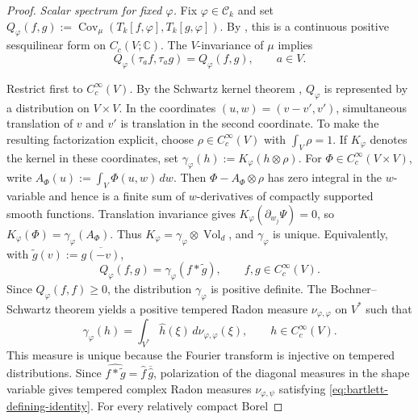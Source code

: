 \documentclass[11pt,reqno,a4paper]{amsart}
\numberwithin{equation}{section}
\theoremstyle{compact}
\theoremstyle{definition}
\theoremstyle{definition}
\newcommand{\Cov}{\operatorname{Cov}}
\newcommand{\Vol}{\operatorname{Vol}}
\begin{document}
\begin{proof}
\smallskip\noindent\emph{Scalar spectrum for fixed $\varphi$.}
Fix $\varphi\in\mathcal C_k$ and set
$Q_\varphi(f,g):=\Cov_\mu(T_k[f,\varphi],T_k[g,\varphi])$.  By
, this is a continuous positive
sesquilinear form on $C_c(V;\mathbb C)$.  The $V$-invariance of $\mu$
implies
\begin{equation}\label{eq:bartlett-translation-invariance}
  Q_\varphi(\tau_a f,\tau_a g)=Q_\varphi(f,g),
  \qquad a\in V.
\end{equation}

Restrict first to $C_c^\infty(V)$.  By the Schwartz kernel theorem
\cite{Sch66}, $Q_\varphi$ is represented by a distribution on
$V\times V$.  In the
coordinates $(u,w)=(v-v',v')$, simultaneous translation of $v$ and $v'$ is
translation in the second coordinate.  To make the resulting factorization
explicit, choose $\rho\in C_c^\infty(V)$ with $\int_V\rho=1$.  If $K_\varphi$
denotes the kernel in these coordinates, set
$\gamma_\varphi(h):=K_\varphi(h\otimes\rho)$.  For
$\Phi\in C_c^\infty(V\times V)$, write
$A_\Phi(u):=\int_V\Phi(u,w)\,dw$.  Then
$\Phi-A_\Phi\otimes\rho$ has zero integral in the $w$-variable and hence is
a finite sum of $w$-derivatives of compactly supported smooth functions.
Translation invariance gives
$K_\varphi(\partial_{w_j}\Psi)=0$, so
$K_\varphi(\Phi)=\gamma_\varphi(A_\Phi)$.  Thus
$K_\varphi=\gamma_\varphi\otimes\Vol_d$, and $\gamma_\varphi$ is unique.
Equivalently, with
$\widetilde g(v):=\overline{g(-v)}$,
\begin{equation}\label{eq:covariance-distribution}
  Q_\varphi(f,g)=\gamma_\varphi(f*\widetilde g),
  \qquad f,g\in C_c^\infty(V).
\end{equation}
Since $Q_\varphi(f,f)\geq0$, the distribution $\gamma_\varphi$ is positive
definite.  The Bochner--Schwartz theorem
\cite[Chapter~VII, \S9, Theorem~XVIII]{Sch66} yields a positive tempered
Radon measure $\nu_{\varphi,\varphi}$ on $V^*$ such that
\begin{equation}\label{eq:diagonal-bochner-schwartz}
  \gamma_\varphi(h)
  =\int_{V^*}\widehat h(\xi)\,d\nu_{\varphi,\varphi}(\xi),
  \qquad h\in C_c^\infty(V).
\end{equation}
This measure is unique because the Fourier transform is injective on tempered
distributions.  Since $\widehat{f*\widetilde g}=\widehat f\,\overline{\widehat g}$,
polarization of the diagonal measures in the shape variable gives tempered
complex Radon measures $\nu_{\varphi,\psi}$ satisfying
\eqref{eq:bartlett-defining-identity}.  For every relatively compact Borel

\end{proof}
\end{document}

